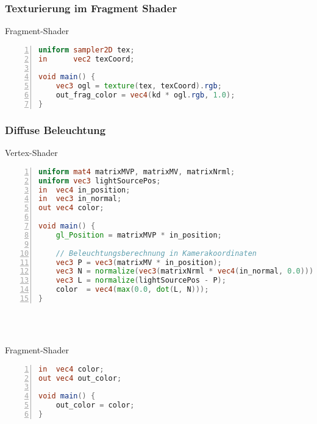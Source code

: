 \subsubsection{Texturierung im Fragment Shader}
\begin{minipage}{\textwidth}
Fragment-Shader
\begin{lstlisting}[frame=single,numbers=left,mathescape,language=GLSL]
uniform sampler2D tex;
in 		vec2 texCoord;

void main() {
	vec3 ogl = texture(tex, texCoord).rgb;
	out_frag_color = vec4(kd * ogl.rgb, 1.0);
}
\end{lstlisting}
\end{minipage}

\subsubsection{Diffuse Beleuchtung}
\begin{minipage}{\textwidth}
Vertex-Shader
\begin{lstlisting}[frame=single,numbers=left,mathescape,language=GLSL]
uniform mat4 matrixMVP, matrixMV, matrixNrml;
uniform vec3 lightSourcePos;
in  vec4 in_position;
in  vec3 in_normal;
out vec4 color;

void main() {
	gl_Position = matrixMVP * in_position;

	// Beleuchtungsberechnung in Kamerakoordinaten
	vec3 P = vec3(matrixMV * in_position);
	vec3 N = normalize(vec3(matrixNrml * vec4(in_normal, 0.0)));
	vec3 L = normalize(lightSourcePos - P);
	color  = vec4(max(0.0, dot(L, N)));
}
\end{lstlisting}
\end{minipage}
\\\\
\begin{minipage}{\textwidth}
Fragment-Shader
\begin{lstlisting}[frame=single,numbers=left,mathescape,language=GLSL]
in  vec4 color;
out vec4 out_color;

void main() {
	out_color = color;
}
\end{lstlisting}
\end{minipage}

